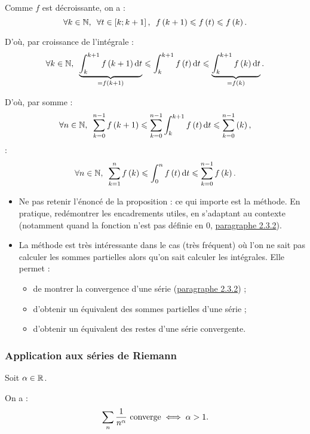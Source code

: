 \begin{dem}
Comme \(f\) est décroissante, on a : \[\quantifs{\forall k\in\N;\forall t\in\intervii{k}{k+1}}f\paren{k+1}\leq f\paren{t}\leq f\paren{k}.\]

D'où, par croissance de l'intégrale : \[\quantifs{\forall k\in\N}\underbrace{\int_k^{k+1}f\paren{k+1}\odif{t}}_{=f\paren{k+1}}\leq\int_k^{k+1}f\paren{t}\odif{t}\leq\underbrace{\int_k^{k+1}f\paren{k}\odif{t}}_{=f\paren{k}}.\]

D'où, par somme : \[\quantifs{\forall n\in\N}\sum_{k=0}^{n-1}f\paren{k+1}\leq\sum_{k=0}^{n-1}\int_k^{k+1}f\paren{t}\odif{t}\leq\sum_{k=0}^{n-1}\paren{k},\] \cad : \[\quantifs{\forall n\in\N}\sum_{k=1}^nf\paren{k}\leq\int_0^nf\paren{t}\odif{t}\leq\sum_{k=0}^{n-1}f\paren{k}.\]
\end{dem}

\begin{rem}
\begin{itemize}
    \item Ne pas retenir l'énoncé de la proposition : ce qui importe est la méthode. En pratique, redémontrer les encadrements utiles, en s'adaptant au contexte (notamment quand la fonction n'est pas définie en \(0\), \cf \hyperref[subsubsec:applicationAuxSériesDeRiemann]{paragraphe 2.3.2}). \\
    \item La méthode est très intéressante dans le cas (très fréquent) où l'on ne sait pas calculer les sommes partielles alors qu'on sait calculer les intégrales. Elle permet : \begin{itemize}
        \item de montrer la convergence d'une série (\cf \hyperref[subsubsec:applicationAuxSériesDeRiemann]{paragraphe 2.3.2}) ;
        \item d'obtenir un équivalent des sommes partielles d'une série ;
        \item d'obtenir un équivalent des restes d'une série convergente.
    \end{itemize}
\end{itemize}
\end{rem}

\subsubsection{Application aux séries de Riemann}\label{subsubsec:applicationAuxSériesDeRiemann}

\begin{theo}
Soit \(\alpha\in\mathbb{R}\).

On a : \[\sum_n\dfrac{1}{n^\alpha}\text{ converge}\iff\alpha>1.\]
\end{theo}

